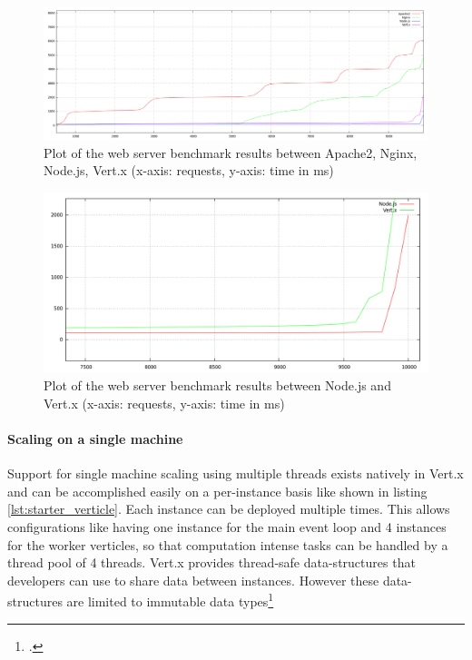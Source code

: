 \begin{figure}[htbp]
\centering
\includegraphics[width=\textwidth]{img/200kb_benchmark.png}
\caption[Plot of the web server benchmark results (all servers)]{Plot of the web server benchmark results between Apache2, Nginx, Node.js, Vert.x (x-axis: requests, y-axis: time in ms)}
\label{fig:benchmark_all}
\end{figure}

\begin{figure}[htbp]
\centering
\includegraphics[width=\textwidth]{img/200kb_benchmark_node_vertx.png}
\caption[Plot of the web server benchmark results (asynchronous servers)]{Plot of the web server benchmark results between Node.js and Vert.x (x-axis: requests, y-axis: time in ms)}
\label{fig:benchmark_async}
\end{figure}


\paragraph{Scaling on a single machine}
Support for single machine scaling using multiple threads exists natively in
Vert.x and can be accomplished easily on a per-instance basis like shown in listing \ref{lst:starter_verticle}.
Each instance can
be deployed multiple times. This allows configurations like having one instance
for the main event loop and 4 instances for the worker verticles, so that
computation intense tasks can be handled by a thread pool of 4 threads. 
Vert.x provides  thread-safe data-structures that developers can use to share data between instances. However these data-structures are limited to immutable data types\footcite[Cf.][]{vertx_2012}\\

